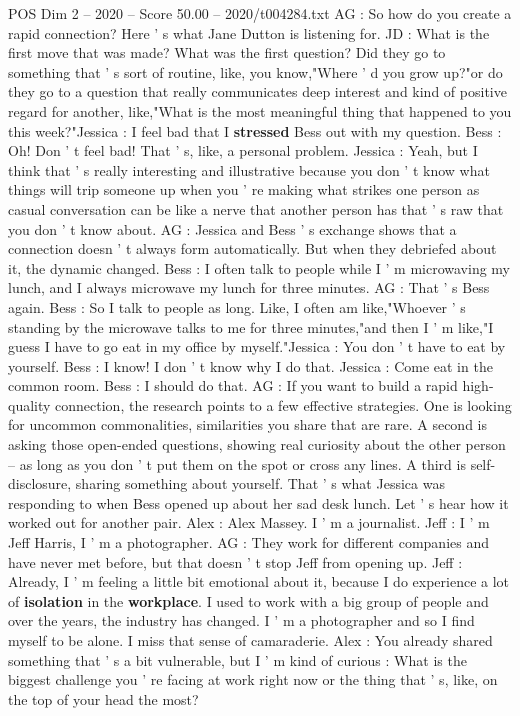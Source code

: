 \begin{textsample}{POS Dim 2 – 2020 – Score 50.00 – 2020/t004284.txt}
AG : So how do you create a rapid connection?
Here ' s what Jane Dutton is listening for.
JD : What is the first move that was made?
What was the first question?
Did they go to something that ' s sort of routine, like, you know,"Where ' d you grow up?"or do they go to a question that really communicates deep interest and kind of positive regard for another, like,"What is the most meaningful thing that happened to you this week?"Jessica : I feel bad that I \textbf{stressed} Bess out with my question.
Bess : Oh!
Don ' t feel bad!
That ' s, like, a personal problem.
Jessica : Yeah, but I think that ' s really interesting and illustrative because you don ' t know what things will trip someone up when you ' re making what strikes one person as casual conversation can be like a nerve that another person has that ' s raw that you don ' t know about.
AG : Jessica and Bess ' s exchange shows that a connection doesn ' t always form automatically.
But when they debriefed about it, the dynamic changed.
Bess : I often talk to people while I ' m microwaving my lunch, and I always microwave my lunch for three minutes.
AG : That ' s Bess again.
Bess : So I talk to people as long.
Like, I often am like,"Whoever ' s standing by the microwave talks to me for three minutes,"and then I ' m like,"I guess I have to go eat in my office by myself."Jessica : You don ' t have to eat by yourself.
Bess : I know!
I don ' t know why I do that.
Jessica : Come eat in the common room.
Bess : I should do that.
AG : If you want to build a rapid high-quality connection, the research points to a few effective strategies.
One is looking for uncommon commonalities, similarities you share that are rare.
A second is asking those open-ended questions, showing real curiosity about the other person -- as long as you don ' t put them on the spot or cross any lines.
A third is self-disclosure, sharing something about yourself.
That ' s what Jessica was responding to when Bess opened up about her sad desk lunch.
Let ' s hear how it worked out for another pair.
Alex : Alex Massey.
I ' m a journalist.
Jeff : I ' m Jeff Harris, I ' m a photographer.
AG : They work for different companies and have never met before, but that doesn ' t stop Jeff from opening up.
Jeff : Already, I ' m feeling a little bit emotional about it, because I do experience a lot of \textbf{isolation} in the \textbf{workplace}.
I used to work with a big group of people and over the years, the industry has changed.
I ' m a photographer and so I find myself to be alone.
I miss that sense of camaraderie.
Alex : You already shared something that ' s a bit vulnerable, but I ' m kind of curious : What is the biggest challenge you ' re facing at work right now or the thing that ' s, like, on the top of your head the most?

\end{textsample}
